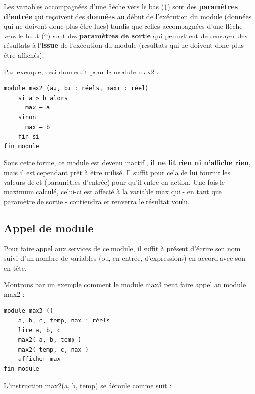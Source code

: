 \documentclass[11pt,a4paper]{article}
\begin{document}
            \par
        
        Les variables accompagn\'ees d'une fl\`eche vers le bas (↓) sont des \textbf{param\`etres d'entr\'ee} qui
        re\c coivent des \textbf{donn\'ees} au d\'ebut de l'ex\'ecution du module (donn\'ees qui ne doivent donc plus
        \^etre lues) tandis que celles accompagn\'ees d'une fl\`eche vers le haut (↑) sont des \textbf{param\`etres
        de sortie} qui permettent de renvoyer des r\'esultats \`a l'\textbf{issue} de l'ex\'ecution du module
        (r\'esultats qui ne doivent donc plus \^etre affich\'es).
      
            \par
        Par exemple, ceci donnerait pour le module max2 : 
            \par
        \begin{verbatim}
module max2 (a↓, b↓ : réels, max↑ : réel)
    si a > b alors
      max ← a
    sinon
      max ← b
    fin si
fin module
      \end{verbatim}
        Sous cette forme, ce module est devenu \guillemotleft  inactif \guillemotright , \textbf{il ne lit rien ni n'affiche rien},
        mais il est cependant pr\^et \`a \^etre utilis\'e. Il suffit pour cela de lui fournir les valeurs de \verb@a@ 
        et \verb@b@ (param\`etres d'entr\'ee) pour qu'il entre en action. Une fois le maximum calcul\'e, celui-ci est
        affect\'e \`a la variable max qui - en tant que param\`etre de sortie - contiendra et renverra le
        r\'esultat voulu.
      
            \par
        \subsection{Appel de module}
        Pour faire appel aux services de ce module, il suffit \`a pr\'esent d'\'ecrire son nom suivi d'un
        nombre de variables (ou, en entr\'ee, d'expressions) en accord avec son en-t\^ete. 
      
            \par
        Montrons par un exemple comment le module max3 peut faire appel au module max2 : 
            \par
        \begin{verbatim}
module max3 ()
    a, b, c, temp, max : réels
    lire a, b, c
    max2( a, b, temp )
    max2( temp, c, max )
    afficher max
fin module
      \end{verbatim}
        L'instruction max2(a, b, temp) se d\'eroule comme suit :
        
\end{document}
